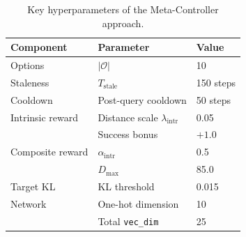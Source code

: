 \begin{table}[H]
\centering
\caption{Key hyperparameters of the Meta-Controller approach.}
\label{tab:hrl_hyperparams}
\begin{tabular}{@{}lll@{}}
\toprule
\textbf{Component} & \textbf{Parameter} & \textbf{Value} \\
\midrule
Options          & $|\mathcal{O}|$                & 10 \\
Staleness        & $T_{\text{stale}}$             & 150 steps \\
Cooldown         & Post-query cooldown            & 50 steps \\
Intrinsic reward & Distance scale $\lambda_{\text{intr}}$ & 0.05 \\
                 & Success bonus                  & $+1.0$ \\
Composite reward & $\alpha_{\text{intr}}$         & 0.5 \\
                 & $D_{\max}$                     & 85.0 \\
Target KL        & KL threshold                   & 0.015 \\
Network          & One-hot dimension              & 10 \\
                 & Total \texttt{vec\_dim}        & 25 \\
\bottomrule
\end{tabular}
\end{table}
